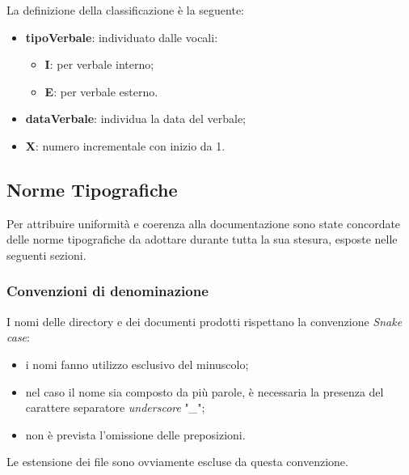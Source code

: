 La definizione della classificazione è la seguente:
\begin{itemize}
	\item \textbf{tipoVerbale}: individuato dalle vocali:
	\begin{itemize}
		\item \textbf{I}: per verbale interno;
		\item \textbf{E}: per verbale esterno.
	\end{itemize}
	\item \textbf{dataVerbale}: individua la data del verbale;
	\item \textbf{X}: numero incrementale con inizio da 1.
\end{itemize}
\subsection{Norme Tipografiche}\label{ProcessiDiSupportoDocumentazioneNormeTipografiche}
\label{sec:NormeTipografiche}
Per attribuire uniformità e coerenza alla documentazione sono state concordate  delle norme tipografiche da adottare durante tutta la sua stesura, esposte nelle seguenti sezioni.
\subsubsection{Convenzioni di denominazione}\label{ProcessiDiSupportoDocumentazioneNormeTipograficheConvenzioniDiDenominanzione}
I nomi delle directory e dei documenti prodotti rispettano la convenzione \textit{Snake case}:%
\begin{itemize}
  \item i nomi fanno utilizzo esclusivo del minuscolo;
  \item nel caso il nome sia composto da più parole, è necessaria la presenza del carattere separatore \textit{underscore} "\_";
  \item non è prevista l'omissione delle preposizioni.
\end{itemize}
Le estensione dei file sono ovviamente escluse da questa convenzione.
